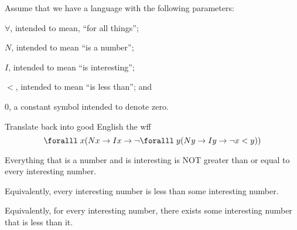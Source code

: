 \setcounter{problem}{1}
\begin{problem}
  Assume that we have a language with the following parameters:
  \begin{enumroman}
    \item $\forall$, intended to mean, ``for all things'';
    \item $N$, intended to mean ``is a number'';
    \item $I$, intended to mean ``is interesting''; 
    \item $<$, intended to mean ``is less than''; and
    \item $0$, a constant symbol intended to denote zero.
  \end{enumroman}

  \step
  Translate back into good English the wff 
  \[ \forall x (Nx \to Ix \to \lnot \forall y(Ny \lto Iy \lto \lnot x < y)) \]
  \begin{Answer}
    Everything that is a number and is interesting is NOT greater than or equal to every interesting number.
    
    \step
    Equivalently,
    every interesting number is less than some interesting number.

    \step
    Equivalently,
    for every interesting number, there exists
    some interesting number that is less than it.
  \end{Answer}
\end{problem}

